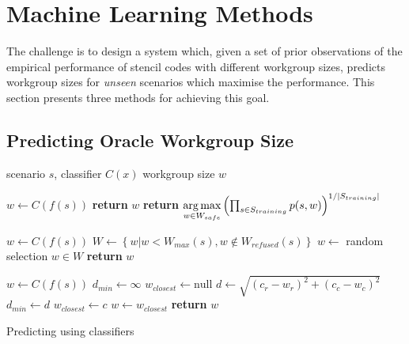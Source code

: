 \documentclass[nonatbib,preprint,10pt]{sigplanconf}
\begin{document}
\section{Machine Learning Methods}

The challenge is to design a system which, given a set of prior
observations of the empirical performance of stencil codes with
different workgroup sizes, predicts workgroup sizes for \emph{unseen}
scenarios which maximise the performance. This section presents three
methods for achieving this goal.


\subsection{Predicting Oracle Workgroup Size}

\begin{algorithm}[t]
\begin{algorithmic}[1]
\Require scenario $s$, classifier $C(x)$
\Ensure workgroup size $w$

\State $w \leftarrow C(f(s))$
    \State \textbf{return} $w$
\Else
  \State \textbf{return} $\underset{w \in W_{safe}}{\operatorname*{arg\,max}}
\left(
  \prod_{s \in S_{training}} p(s, w)
\right)^{1/|S_{training}|}$
\EndIf
\EndProcedure
\item[] %

\State $w \leftarrow C(f(s))$
  \State $W \leftarrow \left\{ w | w < W_{max}(s), w \not\in W_{refused}(s) \right\}$
  \State $w \leftarrow $ random selection $w \in W$
\EndWhile
\State \textbf{return} $w$
\EndProcedure
\item[] %

\State $w \leftarrow C(f(s))$
  \State $d_{min} \leftarrow \infty$
  \State $w_{closest} \leftarrow \text{null}$
    \State $d \leftarrow \sqrt{\left(c_r - w_r\right)^2 + \left(c_c - w_c\right)^2}$
      \State $d_{min} \leftarrow d$
      \State $w_{closest} \leftarrow c$
    \EndIf
  \EndFor
  \State $w \leftarrow w_{closest}$
\EndWhile
\State \textbf{return} $w$
\EndProcedure
\end{algorithmic}
\caption{Predicting using classifiers}
\label{alg:autotune-classification}
\end{algorithm}
\end{document}
